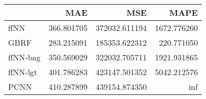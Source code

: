\begin{tabular}{lrrr}
\toprule
{} &         MAE &            MSE &         MAPE \\
\midrule
ffNN     &  366.801705 &  372032.611194 &  1672.776260 \\
GBRF     &  283.215091 &  185353.622312 &   220.771050 \\
ffNN-bag &  350.569029 &  322032.705711 &  1921.931865 \\
ffNN-lgt &  401.786283 &  423147.501352 &  5042.212576 \\
PCNN     &  410.287899 &  439154.874350 &          inf \\
\bottomrule
\end{tabular}
